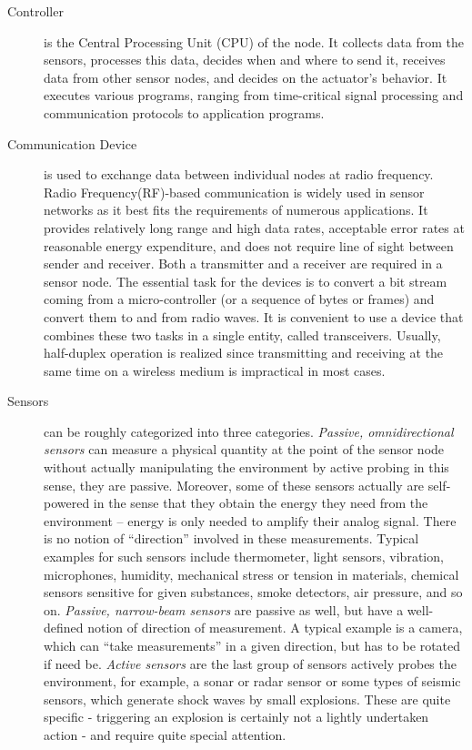 	\begin{description}
	\item[Controller] is the Central Processing Unit (CPU) of the node.
		It collects data from the sensors, processes this data, decides when and where to send it, receives data from other sensor nodes, and decides on the actuator's behavior.
		It executes various programs, ranging from time-critical signal processing and communication protocols to application programs.
	
	\item[Communication Device] is used to exchange data between individual nodes at radio frequency.
		Radio Frequency(RF)-based communication is widely used in sensor networks as it best fits the requirements of numerous applications.
		It provides relatively long range and high data rates, acceptable error rates at reasonable energy expenditure, and does not require line of sight between sender and receiver.
		Both a transmitter and a receiver are required in a sensor node. 
		The essential task for the devices is to convert a bit stream coming from a micro-controller (or a sequence of bytes or frames) and convert them to and from radio waves. 
		It is convenient to use a device that combines these two tasks in a single entity, called transceivers. 
		Usually, half-duplex operation is realized since transmitting and receiving at the same time on a wireless medium is impractical in most cases.

	\item[Sensors] can be roughly categorized into three categories.
		\textit{Passive, omnidirectional sensors} can measure a physical quantity at the point of the sensor node without actually manipulating the environment by active probing in this sense, they are passive. 
		Moreover, some of these sensors actually are self-powered in the sense that they obtain the energy they need from the environment – energy is only needed to amplify their analog signal. 
		There is no notion of ``direction'' involved in these measurements.
		Typical examples for such sensors include thermometer, light sensors, vibration, microphones, humidity, mechanical stress or tension in materials, chemical sensors sensitive for given substances, smoke detectors, air pressure, and so on.
		\textit{Passive, narrow-beam sensors} are passive as well, but have a well-defined notion of direction of measurement. 
		A typical example is a camera, which can ``take measurements'' in a given direction, but has to be rotated if need be.
		\textit{Active sensors} are the last group of sensors actively probes the environment, for example, a sonar or radar sensor or some types of seismic sensors, which generate shock waves by small explosions.
		These are quite specific - triggering an explosion is certainly not a lightly undertaken action - and require quite special attention.


\end{description}
